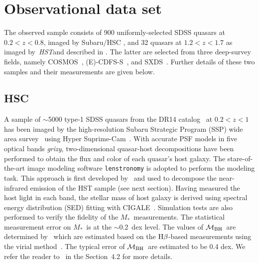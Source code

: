 \documentclass[twocolumn]{aastex631}
\def\smass{{$M_*$}}
\def\hbeta{${\rm H}\beta$}
\def\mbh{$\mathcal M_{\rm BH}$}
\def\hst{{\it HST}}
\begin{document}

\section{Observational data set}
\label{sec:observations}
The observed sample consists of 900 uniformly-selected SDSS quasars at $0.2<z<0.8$, imaged by Subaru/HSC \citep{Li2021a}, and 32 quasars at $1.2<z<1.7$ as imaged by~\hst and described in \citep[][hereafter D20]{Ding2020}. The latter are selected from three deep-survey fields, namely COSMOS~\citep{Civano2016}, (E)-CDFS-S~\citep{Lehmer2005, Xue2011}, and SXDS~\citep{Ueda2008}. Further details of these two samples and their measurements are given below. 

\subsection{HSC}\label{sec:hsc}
A sample of $\sim$5000 type-1 SDSS quasars from the DR14 catalog~\citep{Paris2018} at $0.2<z<1$ has been imaged by the high-resolution Subaru Strategic Program (SSP) wide area survey~\citep{Aihara2019} using Hyper Suprime-Cam~\citep{Miyazaki2018}. With accurate PSF models in five optical bands {\it grizy}, two-dimensional quasar-host decompositions have been performed \citep[][hereafter L21a]{Li2021a} to obtain the flux and color of each quasar's host galaxy. The stare-of-the-art image modeling software {\tt lenstronomy} \citep{Birrer2015, Birrer2018, Birrer2021} is adopted to perform the modeling task. This approach is first developed by~\citet{Ding2020} and used to decompose the near-infrared emission of the HST sample (see next section). Having measured the host light in each band, the stellar mass of host galaxy is derived using spectral energy distribution (SED) fitting with CIGALE~\citep{Boquien2019}. Simulation tests are also performed to verify the fidelity of the \smass\ measurements. The statistical measurement error on \smass\ is at the $\sim$0.2~dex level. The values of \mbh\ are determined by~\citet{Rakshit2020} which are estimated based on the \hbeta-based measurements using the virial method~\citep{Peterson2004, Vestergaard2006}. The typical error of \mbh\ are estimated to be 0.4 dex. We refer the reader to~\citet{Li2021a} in the Section~4.2 for more details.
\end{document}

